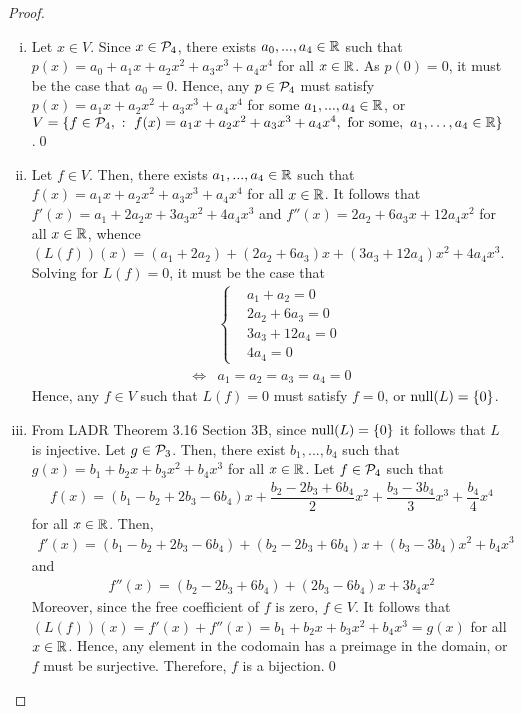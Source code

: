 \begin{proof}
    \renewcommand{\qedsymbol}{$\blacksquare$}
    \begin{enumerate}[(i)]
        \item Let $x\in V$. Since $x\in\P_4$, there exists $a_0,...,a_4\in\R$ such that $p(x)=a_0+a_1x+a_2x^2+a_3x^3+a_4x^4$ for all $x\in\R$.
        As $p(0)=0$, it must be the case that $a_0=0$. Hence, any $p\in\P_4$ must satisfy $p(x)=a_1x+a_2x^2+a_3x^3+a_4x^4$ for some $a_1,...,a_4\in\R$,
        or $V=\{f\in\P_4,\ :\ f(x) = a_1x + a_2x^2 +a_3x^3 + a_4 x^4,\ \text{for some},\ a_1,\dots,a_4 \in\real\}$.\qed
        \item Let $f\in V$. Then, there exists $a_1,...,a_4\in\R$ such that $f(x)=a_1x+a_2x^2+a_3x^3+a_4x^4$ for all $x\in\R$.
        It follows that $f'(x)=a_1+2a_2x+3a_3x^2+4a_4x^3$ and $f''(x)=2a_2+6a_3x+12a_4x^2$ for all $x\in\R$, whence $(L(f))(x)=(a_1+2a_2)+(2a_2+6a_3)x+(3a_3+12a_4)x^2+4a_4x^3$.
        Solving for $L(f)=0$, it must be the case that 
        \begin{align*}
            &\begin{cases}
                &a_1+a_2=0\\
                &2a_2+6a_3=0\\
                &3a_3+12a_4=0\\
                &4a_4=0
            \end{cases}\\\iff
            &a_1=a_2=a_3=a_4=0
        \end{align*}
        Hence, any $f\in V$ such that $L(f)=0$ must satisfy $f=0$, or $\nullla(L)=\{0\}$.
        \item From LADR Theorem 3.16 Section 3B, since $\nullla(L)=\{0\}$ it follows that $L$ is injective.
        Let $g\in\P_3$. Then, there exist $b_1,...,b_4$ such that $g(x)=b_1+b_2x+b_3x^2+b_4x^3$ for all $x\in\R$.
        Let $f\in\P_4$ such that 
        \[
            \begin{aligned}
                f(x)=(b_1-b_2+2b_3-6b_4)x+\dfrac{b_2-2b_3+6b_4}{2}x^2+\dfrac{b_3-3b_4}{3}x^3+\dfrac{b_4}{4}x^4
            \end{aligned}
        \]
        for all $x\in\R$. Then, 
        \[
            \begin{aligned}
                f'(x)=(b_1-b_2+2b_3-6b_4)+(b_2-2b_3+6b_4)x+(b_3-3b_4)x^2+b_4x^3
            \end{aligned}
        \]
        and 
        \[
            \begin{aligned}
                f''(x)=(b_2-2b_3+6b_4)+(2b_3-6b_4)x+3b_4x^2
            \end{aligned}
        \]
        Moreover, since the free coefficient of $f$ is zero, $f\in V$.
        It follows that $(L(f))(x)=f'(x)+f''(x)=b_1+b_2x+b_3x^2+b_4x^3=g(x)$ for all $x\in\R$.
        Hence, any element in the codomain has a preimage in the domain, or $f$ must be surjective.
        Therefore, $f$ is a bijection.\qed
        

\end{enumerate}
\end{proof}
